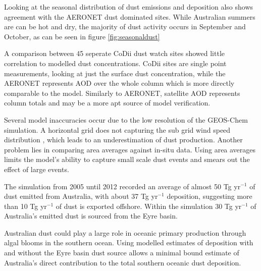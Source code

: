 
Looking at the seasonal distribution of dust emissions and deposition also shows agreement with the AERONET dust dominated sites.
While Australian summers are can be hot and dry, the majority of dust activity occurs in September and October, as can be seen in figure \ref{fig:seasonaldust}

A comparison between 45 seperate CoDii dust watch sites showed little correlation to modelled dust concentrations.
CoDii sites are single point measurements, looking at just the surface dust concentration, while the AERONET represents AOD over the whole column which is more directly comparable to the model.
Similarly to AERONET, satellite AOD represents column totals and may be a more apt source of model verification.

Several model inaccuracies occur due to the low resolution of the GEOS-Chem simulation.
A horizontal grid does not capturing the sub grid wind speed distribution \cite{Ridley_2013}, which leads to an underestimation of dust production.
Another problem lies in comparing area averages against in-situ data.
Using area averages limits the model's ability to capture small scale dust events and smears out the effect of large events.

The simulation from 2005 until 2012 recorded an average of almost 50 Tg yr$^{-1}$ of dust emitted from Australia, with about 37 Tg yr$^{-1}$ deposition, suggesting more than 10 Tg yr$^{-1}$ of dust is exported offshore.
Within the simulation 30 Tg yr$^{-1}$ of Australia's emitted dust is sourced from the Eyre basin.

Australian dust could play a large role in oceanic primary production through algal blooms in the southern ocean.
Using modelled estimates of deposition with and without the Eyre basin dust source allows a minimal bound estimate of Australia's direct contribution to the total southern oceanic dust deposition.
